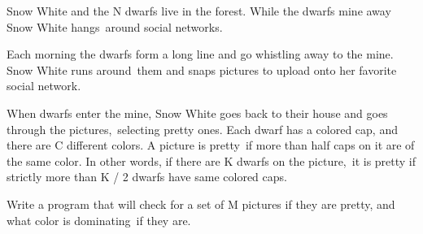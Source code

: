 Snow White and the N dwarfs live in the forest. While the dwarfs mine away Snow White hangs around social networks.  

   Each morning the dwarfs form a long line and go whistling away to the mine. Snow White runs around them and snaps pictures to upload onto her favorite social network.  

   When dwarfs enter the mine, Snow White goes back to their house and goes through the pictures, selecting pretty ones. Each dwarf has a colored cap, and there are C different colors. A picture is pretty if more than half caps on it are of the same color. In other words, if there are K dwarfs on the picture, it is pretty if strictly more than K / 2 dwarfs have same colored caps.  

   Write a program that will check for a set of M pictures if they are pretty, and what color is dominating if they are.  

\